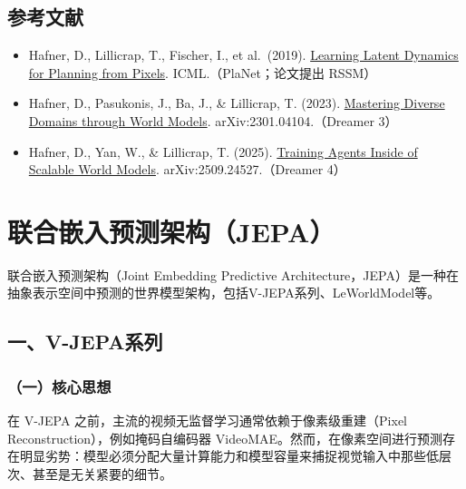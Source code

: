 \hypertarget{ux53c2ux8003ux6587ux732e-156}{%
\subsection{参考文献}\label{ux53c2ux8003ux6587ux732e-156}}

\vspace{0.25em}
\begin{itemize}
\tightlist
\item
  Hafner, D., Lillicrap, T., Fischer, I., et al.~(2019). \href{https://arxiv.org/abs/1811.04551}{Learning Latent Dynamics for Planning from Pixels}. ICML.（PlaNet；论文提出 RSSM）
\item
  Hafner, D., Pasukonis, J., Ba, J., \& Lillicrap, T. (2023). \href{https://arxiv.org/abs/2301.04104}{Mastering Diverse Domains through World Models}. arXiv:2301.04104.（Dreamer 3）
\item
  Hafner, D., Yan, W., \& Lillicrap, T. (2025). \href{https://arxiv.org/abs/2509.24527}{Training Agents Inside of Scalable World Models}. arXiv:2509.24527.（Dreamer 4）
\end{itemize}

\clearpage

\hypertarget{ux8054ux5408ux5d4cux5165ux9884ux6d4bux67b6ux6784jepa}{%
\section{联合嵌入预测架构（JEPA）}\label{ux8054ux5408ux5d4cux5165ux9884ux6d4bux67b6ux6784jepa}}

联合嵌入预测架构（Joint Embedding Predictive Architecture，JEPA）是一种在抽象表示空间中预测的世界模型架构，包括V-JEPA系列、LeWorldModel等。

\hypertarget{ux4e00v-jepaux7cfbux5217}{%
\subsection{一、V-JEPA系列}\label{ux4e00v-jepaux7cfbux5217}}

\hypertarget{ux4e00ux6838ux5fc3ux601dux60f3-18}{%
\subsubsection{（一）核心思想}\label{ux4e00ux6838ux5fc3ux601dux60f3-18}}

在 V-JEPA 之前，主流的视频无监督学习通常依赖于像素级重建（Pixel Reconstruction），例如掩码自编码器 VideoMAE。然而，在像素空间进行预测存在明显劣势：模型必须分配大量计算能力和模型容量来捕捉视觉输入中那些低层次、甚至是无关紧要的细节。

